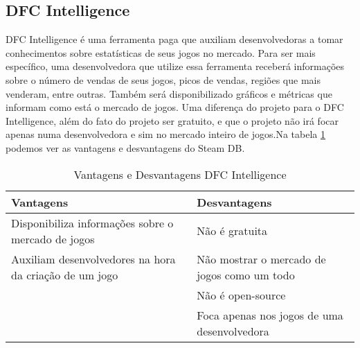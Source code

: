 \subsection{DFC Intelligence}
DFC Intelligence é uma ferramenta paga que auxiliam desenvolvedoras a tomar conhecimentos sobre estatísticas de seus jogos no mercado. Para ser mais específico, uma desenvolvedora que utilize essa ferramenta receberá informações sobre o número de vendas de seus jogos, picos de vendas, regiões que mais venderam, entre outras. Também será disponibilizado gráficos e métricas que informam como está o mercado de jogos\cite{dfc_intelligence}. Uma diferença do projeto para o DFC Intelligence, além do fato do projeto ser gratuito, e que o projeto não irá focar apenas numa desenvolvedora e sim no mercado inteiro de jogos.Na tabela \ref{table:dfc_intelligence} podemos ver as vantagens e desvantagens do Steam DB.
\begin{table}
\centering
\begin{tabular}{|p{7cm}|p{7cm}|}
\hline \textbf{Vantagens} & \textbf{Desvantagens} \\
\hline Disponibiliza informações sobre o mercado de jogos & Não é gratuita \\
\hline Auxiliam desenvolvedores na hora da criação de um jogo & Não mostrar o mercado de jogos como um todo \\
\hline & Não é open-source \\
\hline & Foca apenas nos jogos de uma desenvolvedora \\
\hline
\end{tabular}
\caption{Vantagens e Desvantagens DFC Intelligence}
\label{table:dfc_intelligence}
\end{table}